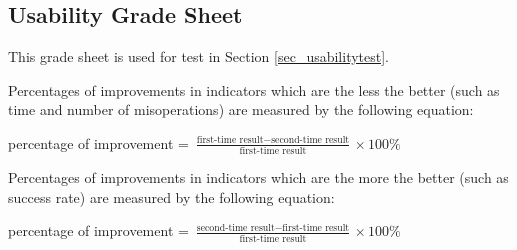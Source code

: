 \documentclass[12pt, titlepage]{article}
\begin{document}
\subsection{Usability Grade Sheet}
This grade sheet is used for test in Section \ref{sec_usabilitytest}.

Percentages of improvements in indicators which are the less the better (such as time and number of misoperations) are measured by the following equation:

percentage of improvement = $\frac{\text{first-time result} - \text{second-time result}}{\text{first-time result}} \times 100\%$

Percentages of improvements in indicators which are the more the better (such as success rate) are measured by the following equation:

percentage of improvement = $\frac{\text{second-time result} - \text{first-time result}}{\text{first-time result}} \times 100\%$
\end{document}
